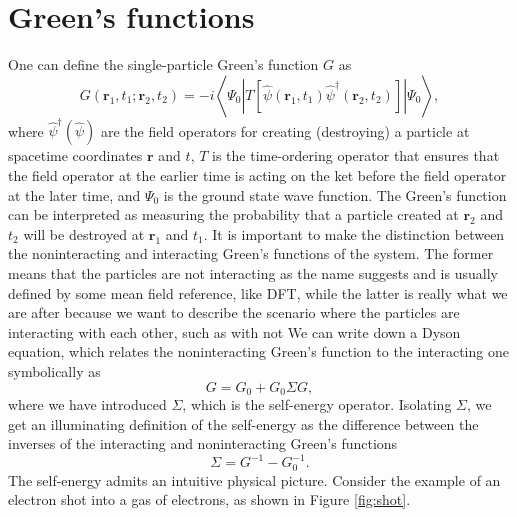 \documentclass[12pt]{article}
\begin{document}
\section{Green's functions}
One can define the single-particle Green's function $G$ as
\begin{equation}
G\left(\mathbf{r}_1, t_1 ; \mathbf{r}_2, t_2\right)=-i\left\langle\Psi_0\left|T\left[\hat{\psi }\left(\mathbf{r}_1, t_1\right) \hat{\psi}^{\dagger}\left(\mathbf{r}_2, t_2\right)\right]\right| \Psi_0\right\rangle,
\label{eq:greens}
\end{equation}
where $ \hat{\psi}^{\dagger}(\hat{\psi})$ are the field operators for creating (destroying) a particle at spacetime coordinates $\mathbf{r}$ and $t$, $T$ is the time-ordering operator that ensures that the field operator at the earlier time is acting on the ket before the field operator at the later time, and $\Psi_0$ is the ground state wave function. The Green's function can be interpreted as measuring the probability that a particle created at $\mathbf{r}_2$ and $t_2$ will be destroyed at $\mathbf{r}_1$ and $t_1$. It is important to make the distinction between the noninteracting and interacting Green's functions of the system. The former means that the particles are not interacting as the name suggests and is usually defined by some mean field reference, like DFT, while the latter is really what we are after because we want to describe the scenario where the particles are interacting with each other, such as with not We can write down a Dyson equation\autocite{dyson_s_1949}, which relates the noninteracting Green's function to the interacting one symbolically as
\begin{equation}
G=G_0+G_0\Sigma G,
\label{eq:dyson}
\end{equation}
where we have introduced $\Sigma$, which is the self-energy operator. Isolating $\Sigma$, we get an illuminating definition of the self-energy as the difference between the inverses of the interacting and noninteracting Green's functions
\begin{equation}
\Sigma = G^{-1}-G_0^{-1}.
\end{equation}
The self-energy admits an intuitive physical picture. Consider the example of an electron shot into a gas of electrons, as shown in Figure \ref{fig:shot}.
\end{document}
